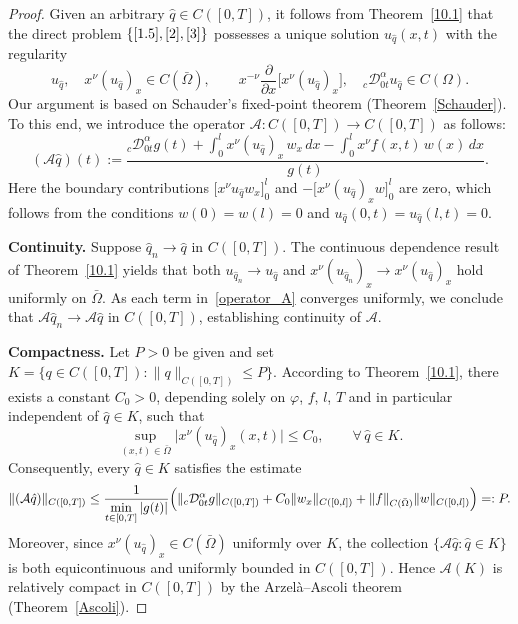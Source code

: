 \documentclass[reqno]{amsart}
\theoremstyle{definition}
\numberwithin{equation}{section}
\begin{document}
\begin{proof}
 
 Given an arbitrary $\hat{q} \in C([0,T])$, it follows from Theorem~\ref{10.1} that
the direct problem $\{\eqref{1.5},\eqref{2},\eqref{3}\}$ possesses a unique solution
$u_{\hat{q}}(x,t)$ with the regularity
\begin{equation*}
    u_{\hat{q}},\quad x^\nu (u_{\hat{q}})_x \in C(\bar{\Omega}), \qquad
    x^{-\nu}\frac{\partial}{\partial x}\bigl[x^\nu (u_{\hat{q}})_x\bigr],\quad
    {}_{c}\mathcal{D}_{0t}^\alpha u_{\hat{q}} \in C(\Omega).
\end{equation*}
Our argument is based on Schauder's fixed-point theorem (Theorem~\ref{Schauder}).
To this end, we introduce the operator $\mathcal{A}: C([0,T])\to C([0,T])$ as follows:
\begin{equation}
\label{operator_A}
    (\mathcal{A}\hat{q})(t) :=
    \frac{{}_{c}\mathcal{D}_{0t}^\alpha g(t)
    +\displaystyle\int_0^l x^\nu (u_{\hat{q}})_x\,w_x\,dx
    -\displaystyle\int_0^l x^\nu f(x,t)\,w(x)\,dx}{g(t)}.
\end{equation}
Here the boundary contributions $\bigl[x^\nu u_{\hat{q}} w_x\bigr]_0^l$ and
$-\bigl[x^\nu (u_{\hat{q}})_x w\bigr]_0^l$ are zero, which follows from the conditions
$w(0)=w(l)=0$ and $u_{\hat{q}}(0,t)=u_{\hat{q}}(l,t)=0$.

\textbf{Continuity.}
Suppose $\hat{q}_n\to\hat{q}$ in $C([0,T])$.
The continuous dependence result of Theorem~\ref{10.1} yields that
both $u_{\hat{q}_n}\to u_{\hat{q}}$ and
$x^\nu(u_{\hat{q}_n})_x \to x^\nu(u_{\hat{q}})_x$
hold uniformly on $\bar{\Omega}$.
As each term in~\eqref{operator_A} converges uniformly,
we conclude that $\mathcal{A}\hat{q}_n\to\mathcal{A}\hat{q}$ in $C([0,T])$,
establishing continuity of $\mathcal{A}$.

\textbf{Compactness.}
Let $P>0$ be given and set $K=\{q\in C([0,T]):\|q\|_{C([0,T])}\leq P\}$.
According to Theorem~\ref{10.1}, there exists a constant $C_0>0$,
depending solely on $\varphi$, $f$, $l$, $T$ and in particular
independent of $\hat{q}\in K$, such that
\begin{equation*}
    \sup_{(x,t)\in\bar{\Omega}}\bigl|x^\nu(u_{\hat{q}})_x(x,t)\bigr| \leq C_0,
    \qquad \forall\, \hat{q}\in K.
\end{equation*}
Consequently, every $\hat{q}\in K$ satisfies the estimate
\begin{equation*}
    \|(\mathcal{A}\hat{q})\|_{C([0,T])}
    \leq
    \frac{1}{\displaystyle\min_{t\in[0,T]}|g(t)|}
    \Bigl(
        \|{}_{c}\mathcal{D}_{0t}^\alpha g\|_{C([0,T])}
        + C_0\|w_x\|_{C([0,l])}
        + \|f\|_{C(\bar{\Omega})}\|w\|_{C([0,l])}
    \Bigr) =: P.
\end{equation*}
Moreover, since $x^\nu(u_{\hat{q}})_x\in C(\bar{\Omega})$ uniformly over $K$,
the collection $\{\mathcal{A}\hat{q}:\hat{q}\in K\}$ is both equicontinuous
and uniformly bounded in $C([0,T])$.
Hence $\mathcal{A}(K)$ is relatively compact in $C([0,T])$
by the Arzel\`{a}--Ascoli theorem (Theorem~\ref{Ascoli}).


\end{proof}
\end{document}
